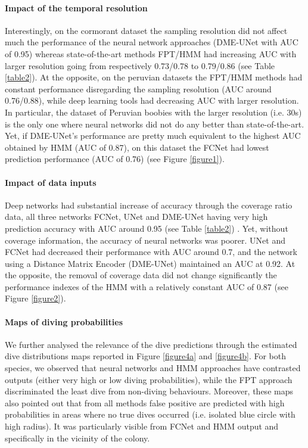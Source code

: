 \documentclass{article}
\begin{document}
\paragraph{Impact of the temporal resolution}
Interestingly, on the cormorant dataset the sampling resolution did not affect much the performance of the neural network approaches (DME-UNet with AUC of 0.95) whereas state-of-the-art methods FPT/HMM had increasing AUC with larger resolution going from respectively 0.73/0.78 to 0.79/0.86 (see Table \ref{table2}).
At the opposite, on the peruvian datasets the FPT/HMM methods had constant performance disregarding the sampling resolution (AUC around 0.76/0.88), while deep learning tools had decreasing AUC with larger resolution. In particular, the dataset of Peruvian boobies with the larger resolution (i.e. 30s) is the only one where neural networks did not do any better than state-of-the-art. Yet, if DME-UNet's performance are pretty much equivalent to the highest AUC obtained by HMM (AUC of 0.87), on this dataset the FCNet had lowest prediction performance (AUC of 0.76) (see Figure \ref{figure1}).

\paragraph{Impact of data inputs}
Deep networks had substantial increase of accuracy through the coverage ratio data, all three networks FCNet, UNet and DME-UNet having very high prediction accuracy with AUC around 0.95 (see Table \ref{table2}) .
Yet, without coverage information, the accuracy of neural networks was poorer. UNet and FCNet had decreased their performance with AUC around 0.7, and the network using a Distance Matrix Encoder (DME-UNet) maintained an AUC at 0.92.
At the opposite, the removal of coverage data did not change significantly the performance indexes of the HMM with a relatively constant AUC of 0.87 (see Figure \ref{figure2}).

\paragraph{Maps of diving probabilities}
We further analysed the relevance of the dive predictions through the estimated dive distributions maps reported in Figure \ref{figure4a} and \ref{figure4b}. For both species, we observed that neural networks and HMM approaches have contrasted outputs (either very high or low diving probabilities), while the FPT approach discriminated the least dive from non-diving behaviours. Moreover, these maps also pointed out that from all methods false positive are predicted with high probabilities in areas where no true dives occurred (i.e. isolated blue circle with high radius). It was particularly visible from FCNet and HMM output and specifically in the vicinity of the colony.
\end{document}
